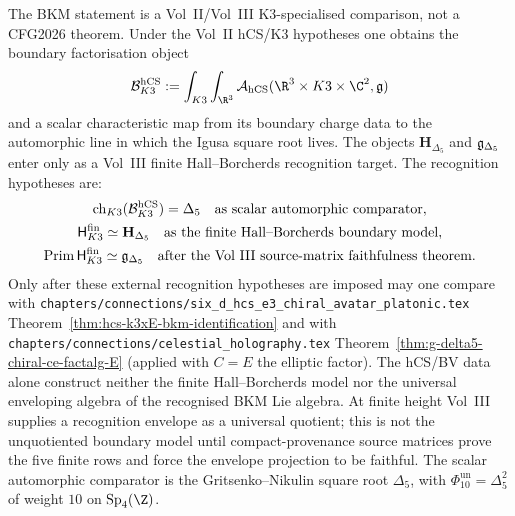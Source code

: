 \begin{theorem}
\label{thm:cfg-row-14}
The BKM statement is a Vol~II/Vol~III K3-specialised comparison, not a
CFG2026 theorem. Under the Vol~II hCS/K3 hypotheses one obtains the
boundary factorisation object
\[
 \cB^{\hCS}_{K3}:=
 \int_{K3}\int_{\R^3}
 \cA_{\hCS}(\R^3\times K3\times\C^2,\fg)
\]
and a scalar characteristic map from its boundary charge data to the
automorphic line in which the Igusa square root lives. The objects
$\mathbf H_{\Delta_5}$ and $\mathfrak{g}_{\Delta_5}$ enter only as a Vol~III
finite Hall--Borcherds recognition target. The recognition hypotheses
are:
\[
\begin{gathered}
 \mathrm{ch}_{K3}(\mathcal{B}^{\mathrm{hCS}}_{K3})=\Delta_5
 \quad\text{as scalar automorphic comparator},\\
\mathsf H^{\mathrm{fin}}_{K3}\simeq \mathbf H_{\Delta_5}
\quad\text{as the finite Hall--Borcherds boundary model},\\
\mathrm{Prim}\,\mathsf H^{\mathrm{fin}}_{K3}\simeq \mathfrak{g}_{\Delta_5}
\quad\text{after the Vol~III source-matrix faithfulness theorem}.
\end{gathered}
\]
Only after these external recognition hypotheses are imposed may one
compare with
\texttt{chapters/connections/six\_d\_hcs\_e3\_chiral\_avatar\_platonic.tex}
Theorem~\ref{thm:hcs-k3xE-bkm-identification} and with
\texttt{chapters/connections/celestial\_holography.tex}
Theorem~\ref{thm:g-delta5-chiral-ce-factalg-E} (applied with
$C = E$ the elliptic factor). The hCS/BV data alone construct neither
the finite Hall--Borcherds model nor the universal enveloping algebra of
the recognised BKM Lie algebra. At finite height Vol~III supplies a
recognition envelope as a universal quotient; this is not the
unquotiented boundary model until compact-provenance source matrices
prove the five finite rows and force the envelope projection to be
faithful.
The scalar automorphic comparator is the
Gritsenko--Nikulin square root $\Delta_5$, with
$\Phi_{10}^{\mathrm{un}}=\Delta_5^2$ of weight $10$ on
$\mathrm{Sp}_4(\Z)$.
\end{theorem}

